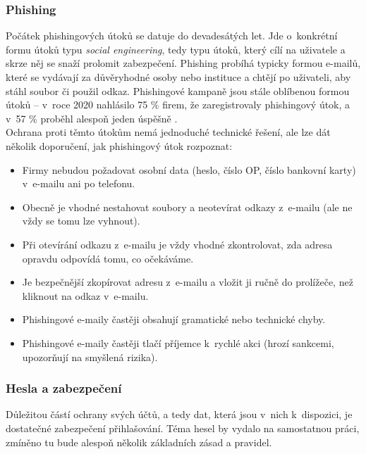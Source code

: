\subsubsection*{Phishing}
Počátek phishingových útoků se datuje do devadesátých let. Jde o~konkrétní formu útoků typu \textit{social engineering}, tedy typu útoků, který cílí na uživatele a skrze něj se snaží prolomit zabezpečení. Phishing probíhá typicky formou e-mailů, které se vydávají za důvěryhodné osoby nebo instituce a chtějí po uživateli, aby stáhl soubor či použil odkaz. Phishingové kampaně jsou stále oblíbenou formou útoků -- v~roce 2020 nahlásilo 75 \% firem, že zaregistrovaly phishingový útok, a v~57 \% proběhl alespoň jeden úspěšně \citep{phishing-success}.\\
Ochrana proti těmto útokům nemá jednoduché technické řešení, ale lze dát několik doporučení, jak phishingový útok rozpoznat:
\begin{itemize}
	\item Firmy nebudou požadovat osobní data (heslo, číslo OP, číslo bankovní karty) v~e-mailu ani po telefonu.
	\item Obecně je vhodné nestahovat soubory a neotevírat odkazy z~e-mailu (ale ne vždy se tomu lze vyhnout).
	\item Při otevírání odkazu z~e-mailu je vždy vhodné zkontrolovat, zda adresa opravdu odpovídá tomu, co očekáváme.
	\item Je bezpečnější zkopírovat adresu z~e-mailu a vložit ji ručně do prolížeče, než kliknout na odkaz v~e-mailu.
	\item Phishingové e-maily častěji obsahují gramatické nebo technické chyby.
	\item Phishingové e-maily častěji tlačí příjemce k~rychlé akci (hrozí sankcemi, upozorňují na smyšlená rizika).
\end{itemize}




\subsubsection*{Hesla a zabezpečení}
Důležitou částí ochrany svých účtů, a tedy dat, která jsou v~nich k~dispozici, je dostatečné zabezpečení přihlašování. Téma hesel by vydalo na samostatnou práci, zmíněno tu bude alespoň několik základních zásad a pravidel.

